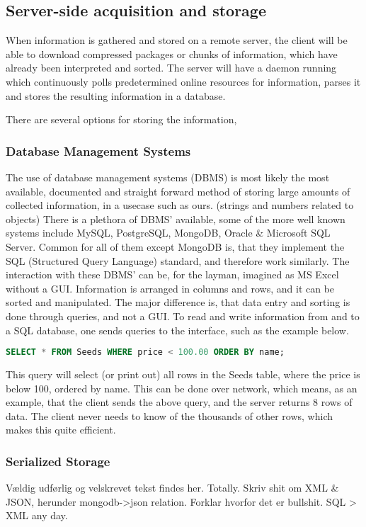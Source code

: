 \subsection{Server-side acquisition and storage}
When information is gathered and stored on a remote server, the client will be able to download compressed packages or chunks of information, which have already been interpreted and sorted. The server will have a daemon running which continuously polls predetermined online resources for information, parses it and stores the resulting information in a database.

There are several options for storing the information, 

\subsubsection{Database Management Systems}
The use of database management systems (DBMS) is most likely the most available, documented and straight forward method of storing large amounts of collected information, in a usecase such as ours. (strings and numbers related to objects)  There is a plethora of DBMS' available, some of the more well known systems include MySQL, PostgreSQL, MongoDB, Oracle \& Microsoft SQL Server. Common for all of them except MongoDB is, that they implement the SQL (Structured Query Language) standard, and therefore work similarly.
The interaction with these DBMS' can be, for the layman, imagined as MS Excel without a GUI. Information is arranged in columns and rows, and it can be sorted and manipulated. The major difference is, that data entry and sorting is done through queries, and not a GUI.
To read and write information from and to a SQL database, one sends queries to the interface, such as the example below.
\begin{lstlisting}[frame=single, language=SQL]
SELECT * FROM Seeds WHERE price < 100.00 ORDER BY name;
\end{lstlisting}
This query will select (or print out) all rows in the Seeds table, where the price is below 100, ordered by name. This can be done over network, which means, as an example, that the client sends the above query, and the server returns 8 rows of data. The client never needs to know of the thousands of other rows, which makes this quite efficient.

\subsubsection{Serialized Storage}
Vældig udførlig og velskrevet tekst findes her. Totally.
Skriv shit om XML \& JSON, herunder mongodb->json relation.
Forklar hvorfor det er bullshit.
SQL > XML any day. %
